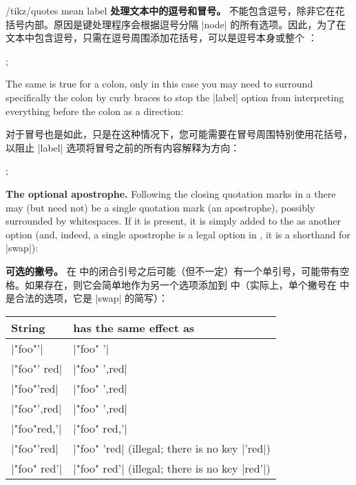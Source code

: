 \begin{key}{/tikz/quotes mean label}
    \noindent\textbf{处理文本中的逗号和冒号。}
 不能包含逗号，除非它在花括号内部。原因是键处理程序会根据逗号分隔 |node| 的所有选项。因此，为了在文本中包含逗号，只需在逗号周围添加花括号，可以是逗号本身或整个 ：
\begin{codeexample}[preamble={\usetikzlibrary{quotes}}]
\tikz {};
\end{codeexample}
    The same is true for a colon, only in this case you may need to surround
    specifically the colon by curly braces to stop the |label| option from
    interpreting everything before the colon as a direction:
    
    对于冒号也是如此，只是在这种情况下，您可能需要在冒号周围特别使用花括号，以阻止 |label| 选项将冒号之前的所有内容解释为方向：
\begin{codeexample}[preamble={\usetikzlibrary{quotes}}]
\tikz {};
\end{codeexample}

    \medskip
    \noindent\textbf{The optional apostrophe.}
    Following the closing quotation marks in a  there may (but
    need not) be a single quotation mark (an apostrophe), possibly surrounded
    by whitespaces. If it is present, it is simply added to the 
    as another option (and, indeed, a single apostrophe is a legal option in
    \tikzname, it is a shorthand for |swap|):

    \noindent\textbf{可选的撇号。}
在  中的闭合引号之后可能（但不一定）有一个单引号，可能带有空格。如果存在，则它会简单地作为另一个选项添加到  中（实际上，单个撇号在 \tikzname 中是合法的选项，它是 |swap| 的简写）：

    \begin{tabular}{ll}
        String         & has the same effect as \\\hline
        |"foo"'|       & |"foo" {'}| \\
        |"foo"' red|   & |"foo" {',red}| \\
        |"foo"'{red}|  & |"foo" {',red}| \\
        |"foo"{',red}| & |"foo" {',red}| \\
        |"foo"{red,'}| & |"foo" {red,'}| \\
        |"foo"{'red}|  & |"foo" {'red}| (illegal; there is no key |'red|)\\
        |"foo" red'|   & |"foo" {red'}| (illegal; there is no key |red'|)\\
    \end{tabular}
\end{key}

